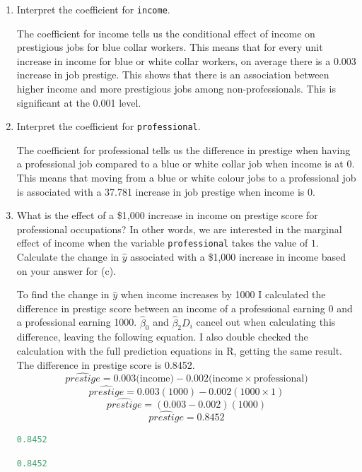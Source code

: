 \documentclass[12pt,letterpaper]{article}
\begin{document}
\begin{enumerate}
	\item [(d)]
	Interpret the coefficient for \texttt{income}.
	
	\noindent The coefficient for income tells us the conditional effect of income on prestigious jobs for blue collar workers. This means that for every unit increase in income for blue or white collar workers, on average there is a 0.003 increase in job prestige. This shows that there is an association between higher income and more prestigious jobs among non-professionals. This is significant at the 0.001 level. \\
		
	\item [(e)]
	Interpret the coefficient for \texttt{professional}.
	
	\noindent The coefficient for professional tells us the difference in prestige when having a professional job compared to a blue or white collar job when income is at 0. This means that moving from a blue or white colour jobs to a professional job is associated with a 37.781 increase in job prestige when income is 0.    \\
	
	\item [(f)]
	What is the effect of a \$1,000 increase in income on prestige score for professional occupations? In other words, we are interested in the marginal effect of income when the variable \texttt{professional} takes the value of $1$. Calculate the change in $\hat{y}$ associated with a \$1,000 increase in income based on your answer for (c).
	
	\noindent To find the change in $\hat{y}$ when income increases by 1000 I calculated the difference in prestige score between an income of a professional earning 0 and a professional earning 1000.	$\hat{\beta}_0$ and $\hat{\beta}_2 D_i$ cancel out when calculating this difference, leaving the following equation. I also double checked the calculation with the full prediction equations in R, getting the same result. The difference in prestige score is 0.8452. \\
	\begin{equation}
		\widehat{prestige} = 0.003\text{(income)} - 0.002\text{(income}\times\text{professional)}
	\end{equation}
	\begin{equation}
		\widehat{prestige} = 0.003{(1000)} - 0.002{(1000\times1)}
	\end{equation}
	\begin{equation}
		\widehat{prestige} = (0.003 - 0.002)(1000)
	\end{equation}
	\begin{equation}
		\widehat{prestige} = 0.8452
	\end{equation}
	
	\begin{lstlisting}[language=R]
		0.8452	\end{lstlisting}
	
	\begin{lstlisting}[language=R]
	0.8452	\end{lstlisting}
	

\end{enumerate}
\end{document}
